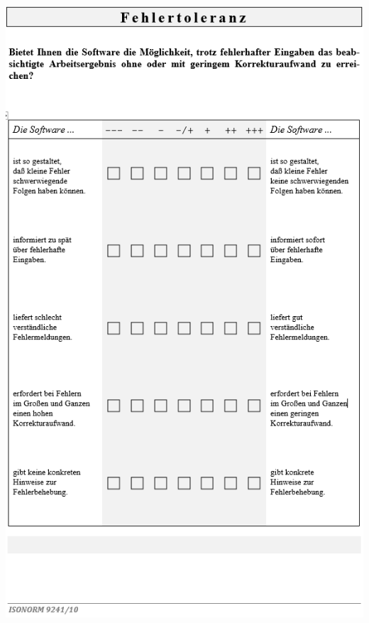 \bigskip\noindent
\begin{minipage}{\textwidth}
  \centering
  \includegraphics{img/ISO9241-10Fragebogen_S5.PNG}
\end{minipage}

